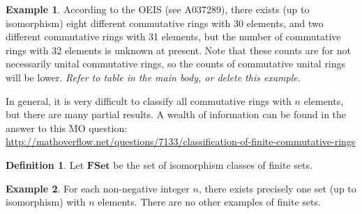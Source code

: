 \documentclass[a4paper]{article}
\theoremstyle{definition}
\newtheorem{definition}{Definition}[section]
\newtheorem{example}{Example}[section]
\theoremstyle{remark}
\newcommand{\defhl}[1]{\textbf{#1}}
\begin{document}
\begin{example}
According to the OEIS (see A037289), there exists (up to isomorphism) eight different commutative rings with 30 elements, and two different commutative rings with 31 elements, but the number of commutative rings with 32 elements is unknown at present. Note that these counts are for not necessarily unital commutative rings, so the counts of commutative unital rings will be lower. \emph{Refer to table in the main body, or delete this example.}
\end{example}

In general, it is very difficult to classify all commutative rings with $n$ elements, but there are many partial results. A wealth of information can be found in the answer to this MO question:
\url{http://mathoverflow.net/questions/7133/classification-of-finite-commutative-rings}



\begin{definition}
Let $\mathbf{FSet}$ be the set of isomorphism classes of finite sets.
\end{definition}

\begin{example}
For each non-negative integer $n$, there exists precisely one set (up to isomorphism) with $n$ elements. There are no other examples of finite sets.
\end{example}






\end{document}
